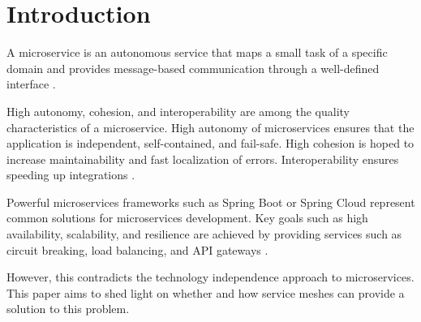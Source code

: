 \section{Introduction}

A microservice is an autonomous service that maps a small task of a specific domain and provides message-based communication through a well-defined interface \cite[p. 18]{microservices-general}.

High autonomy, cohesion, and interoperability are among the quality characteristics of a microservice. High autonomy of microservices ensures that the application is independent, self-contained, and fail-safe. High cohesion is hoped to increase maintainability and fast localization of errors. Interoperability ensures speeding up integrations \cite[p. 208 ff.]{microservices-general}.

Powerful microservices frameworks such as Spring Boot or Spring Cloud represent common solutions for microservices development. Key goals such as high availability, scalability, and resilience are achieved by providing services such as circuit breaking, load balancing, and API gateways \cite{spring-cloud}.

However, this contradicts the technology independence approach \cite{from-monolith} to microservices. This paper aims to shed light on whether and how service meshes can provide a solution to this problem.
